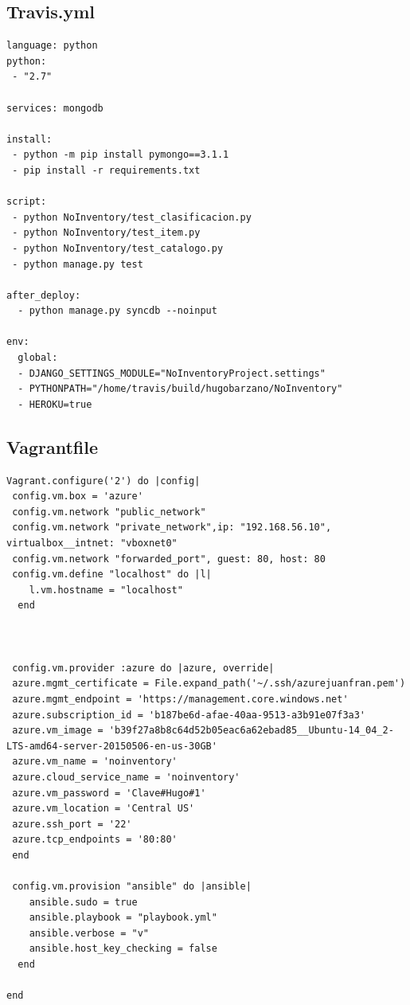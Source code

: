 \documentclass[a4paper,11pt]{book}
\begin{document}
\subsection{Travis.yml}\label{sec:travis}
\begin{lstlisting}
language: python
python:
 - "2.7"

services: mongodb

install:
 - python -m pip install pymongo==3.1.1
 - pip install -r requirements.txt

script:
 - python NoInventory/test_clasificacion.py
 - python NoInventory/test_item.py
 - python NoInventory/test_catalogo.py
 - python manage.py test
 
after_deploy:
  - python manage.py syncdb --noinput

env:
  global:
  - DJANGO_SETTINGS_MODULE="NoInventoryProject.settings"
  - PYTHONPATH="/home/travis/build/hugobarzano/NoInventory"
  - HEROKU=true

\end{lstlisting}

\subsection{Vagrantfile}\label{sec:vagrantfile}
\begin{lstlisting}
Vagrant.configure('2') do |config|
 config.vm.box = 'azure'
 config.vm.network "public_network"
 config.vm.network "private_network",ip: "192.168.56.10", virtualbox__intnet: "vboxnet0"
 config.vm.network "forwarded_port", guest: 80, host: 80
 config.vm.define "localhost" do |l|
    l.vm.hostname = "localhost"
  end



 config.vm.provider :azure do |azure, override|
 azure.mgmt_certificate = File.expand_path('~/.ssh/azurejuanfran.pem')
 azure.mgmt_endpoint = 'https://management.core.windows.net'
 azure.subscription_id = 'b187be6d-afae-40aa-9513-a3b91e07f3a3'
 azure.vm_image = 'b39f27a8b8c64d52b05eac6a62ebad85__Ubuntu-14_04_2-LTS-amd64-server-20150506-en-us-30GB'
 azure.vm_name = 'noinventory'
 azure.cloud_service_name = 'noinventory'
 azure.vm_password = 'Clave#Hugo#1'
 azure.vm_location = 'Central US'
 azure.ssh_port = '22'
 azure.tcp_endpoints = '80:80'
 end

 config.vm.provision "ansible" do |ansible|
    ansible.sudo = true
    ansible.playbook = "playbook.yml"
    ansible.verbose = "v"
    ansible.host_key_checking = false
  end

end
\end{lstlisting}
\end{document}
